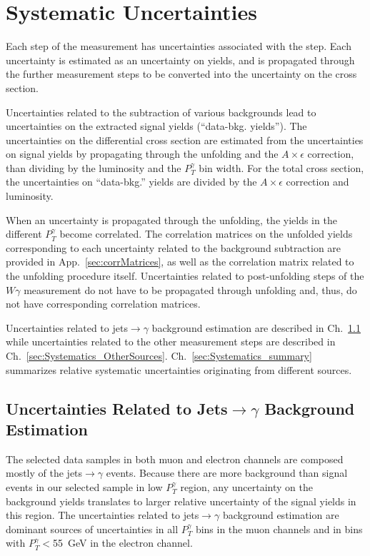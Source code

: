\section{Systematic Uncertainties}
\label{sec:Systematics}

Each step of the measurement has uncertainties associated with the step. Each uncertainty is estimated as an uncertainty on yields, and is propagated through the further measurement steps to be converted into the uncertainty on the cross section. 

Uncertainties related to the subtraction of various backgrounds lead to uncertainties on the extracted signal yields (``data-bkg. yields''). The uncertainties on the differential cross section are estimated from the uncertainties on signal yields by propagating through the unfolding and the $A \times \epsilon$ correction, than dividing by the luminosity and the $P_T^{\gamma}$ bin width. For the total cross section, the uncertainties on ``data-bkg.'' yields are divided by the $A \times \epsilon$ correction and luminosity. 

When an uncertainty is propagated through the unfolding, the yields in the different $P_T^{\gamma}$ become correlated. The correlation matrices on the unfolded yields corresponding to each uncertainty related to the background subtraction are provided in App.~\ref{sec:corrMatrices}, as well as the correlation matrix related to the unfolding procedure itself. Uncertainties related to post-unfolding steps of the $W\gamma$ measurement do not have to be propagated through unfolding and, thus, do not have corresponding correlation matrices. 

Uncertainties related to jets$\rightarrow\gamma$ background estimation are described in Ch.~\ref{sec:Systematics_jtog} while uncertainties related to the other measurement steps are described in Ch.~\ref{sec:Systematics_OtherSources}. Ch.~\ref{sec:Systematics_summary} summarizes relative systematic uncertainties originating from different sources.

\subsection{Uncertainties Related to Jets$\rightarrow\gamma$ Background Estimation}
\label{sec:Systematics_jtog}

The selected data samples in both muon and electron channels are composed mostly of the jets$\rightarrow\gamma$ events. Because there are more background than signal events in our selected sample in low $P_T^{\gamma}$ region, any uncertainty on the background yields translates to larger relative uncertainty of the signal yields in this region. The uncertainties related to jets$\rightarrow\gamma$ background estimation are dominant sources of uncertainties in all $P_T^{\gamma}$ bins in the muon channels and in bins with $P_T^{\gamma}<$55~GeV in the electron channel.

